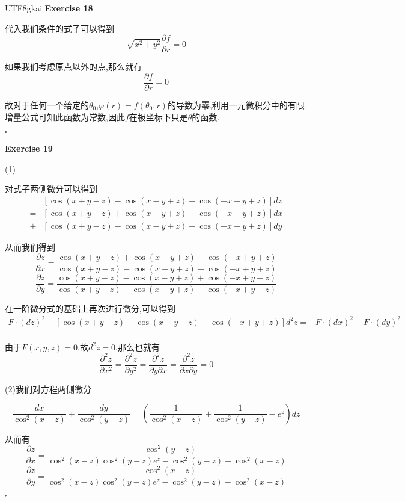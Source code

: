 \documentclass{article}
\newenvironment{exercise}[1]{%
{\textbf{Exercise #1} \\ 
    }
}{
  \hfill $\square$ 
  \par\bigskip 
}
\newcommand{\parameter}[1]{\left(#1\right)}
\begin{document}
\begin{CJK}{UTF8}{gkai}
\begin{exercise}{18}
    代入我们条件的式子可以得到
    \[\sqrt{x^2 + y^2} \frac{\partial f}{\partial r} = 0\]

    如果我们考虑原点以外的点,那么就有
    \[\frac{\partial f}{\partial r} = 0\]

    故对于任何一个给定的$\theta_0$,$\varphi(r) = f(\theta_0,r)$的导数为零,利用一元微积分中的有限增量公式可知此函数为常数,因此$f$在极坐标下只是$\theta$的函数.
\end{exercise}


\begin{exercise}{19}
    (1)


    对式子两侧微分可以得到
    \[
    \begin{aligned}
        &[\cos(x + y - z) - \cos(x - y + z) - \cos(-x + y + z)]dz \\
        =&[\cos(x + y - z) + \cos(x - y + z) - \cos(-x + y + z)]dx\\
        + &[\cos(x + y - z) - \cos(x - y + z) + \cos(-x + y + z)]dy
    \end{aligned}
    \]

    从而我们得到
    \[\frac{\partial z}{\partial x} = \frac{\cos(x + y - z) + \cos(x - y + z) - \cos(-x + y + z)}{\cos(x + y - z) - \cos(x - y + z) - \cos(-x + y + z)}\]
    \[\frac{\partial z}{\partial y} = \frac{\cos(x + y - z) - \cos(x - y + z) + \cos(-x + y + z)}{\cos(x + y - z) - \cos(x - y + z) - \cos(-x + y + z)}\]

    在一阶微分式的基础上再次进行微分,可以得到
    \[
        \begin{aligned}
            F\cdot (dz)^2+[\cos(x + y - z) - \cos(x - y + z) - \cos(-x + y + z)]d^2 z = - F\cdot(dx)^2 - F\cdot (dy)^2\\
        \end{aligned}
    \]

    由于$F(x,y,z) = 0$,故$d^2 z = 0$,那么也就有
    \[\frac{\partial^2 z}{\partial x^2} = \frac{\partial^2 z}{\partial y^2} = \frac{\partial^2 z}{\partial y \partial x} = \frac{\partial^2 z}{\partial x \partial y} = 0\]
        
    (2)我们对方程两侧微分

    \[\frac{dx}{\cos^2(x - z)} + \frac{dy}{\cos^2(y - z)} = \parameter{ \frac{1}{\cos^2(x - z)} + \frac{1}{\cos^2(y - z)} - e^z} dz\]

    从而有
    \[\frac{\partial z}{\partial x} = \frac{-\cos^2(y - z)}{\cos^2(x - z)\cos^2(y - z)e^z -\cos^2(y - z) - \cos^2(x - z)}\]
    \[\frac{\partial z}{\partial y} = \frac{-\cos^2(x - z)}{\cos^2(x - z)\cos^2(y - z)e^z -\cos^2(y - z) - \cos^2(x - z)}\]


\end{exercise}
\end{CJK}
\end{document}
